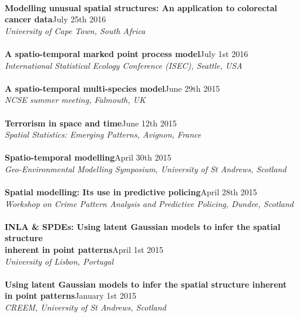 \documentclass[10pt,letter]{article}
\begin{document}
\hdashrule[0.5ex]{4cm}{1pt}{1pt}\\
{\textbf{Modelling unusual spatial structures: An application to colorectal cancer data}}\hfill July 25th 2016\\
 {\sl University of Cape Town, South Africa}\\
\hdashrule[0.5ex]{4cm}{1pt}{1pt}\\
{\textbf{A spatio-temporal marked point process model}}\hfill July 1st 2016\\
 {\sl International Statistical Ecology Conference (ISEC), Seattle, USA}\\
  \hdashrule[0.5ex]{4cm}{1pt}{1pt}\\
 {\textbf{A spatio-temporal multi-species model}}\hfill June 29th 2015\\
 {\sl NCSE summer meeting, Falmouth, UK}\\
 \hdashrule[0.5ex]{4cm}{1pt}{1pt}\\
{\textbf{Terrorism in space and time}}\hfill June 12th 2015\\
 {\sl Spatial Statistics: Emerging Patterns, Avignon, France}\\
 \hdashrule[0.5ex]{4cm}{1pt}{1pt}\\
 {\textbf{Spatio-temporal modelling}}\hfill April 30th 2015\\
 {\sl Geo-Environmental Modelling Symposium, University of St Andrews, Scotland}\\
 \hdashrule[0.5ex]{4cm}{1pt}{1pt}\\
{\textbf{Spatial modelling: Its use in predictive policing}}\hfill April 28th 2015\\
{\sl Workshop on Crime Pattern Analysis and Predictive Policing, Dundee, Scotland}\\
\hdashrule[0.5ex]{4cm}{1pt}{1pt}\\
{\textbf{INLA \& SPDEs: Using latent Gaussian models to infer the spatial structure \\
inherent in point patterns}}\hfill April 1st 2015\\
 {\sl University of Lisbon, Portugal}\\
 \hdashrule[0.5ex]{4cm}{1pt}{1pt}\\
 {\textbf{Using latent Gaussian models to infer the spatial
structure inherent \\in point patterns}}\hfill January 1st 2015\\
 {\sl CREEM, University of St Andrews, Scotland}\\
 \hdashrule[0.5ex]{4cm}{1pt}{1pt}\\
\end{document}
